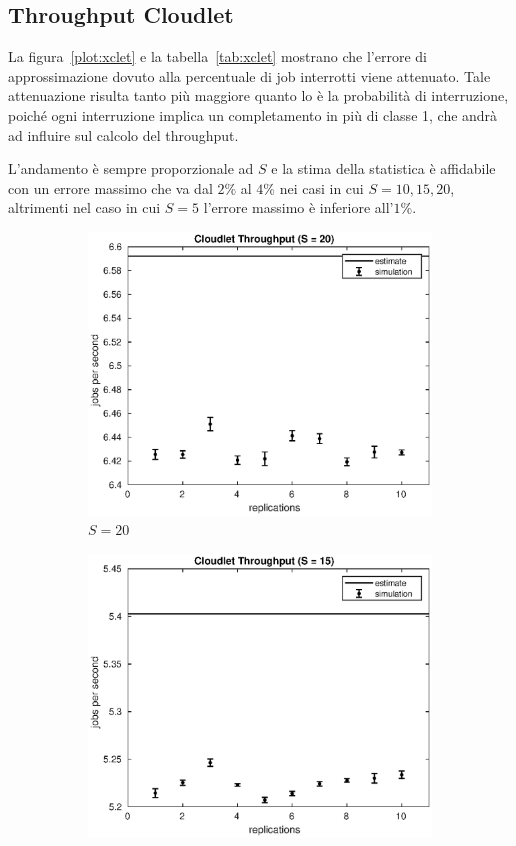 \subsection{Throughput Cloudlet}
La figura~\ref{plot:xclet} e la tabella~\ref{tab:xclet} mostrano che l'errore
di approssimazione dovuto alla percentuale di job interrotti viene attenuato.
Tale attenuazione risulta tanto più maggiore quanto lo è la probabilità di
interruzione, poiché ogni interruzione implica un completamento in più di classe
1, che andrà ad influire sul calcolo del throughput.

L'andamento è sempre proporzionale ad $S$ e la stima della statistica è
affidabile con un errore massimo che va dal $2\%$ al $4\%$ nei casi in cui
$S=10,15,20$, altrimenti nel caso in cui $S=5$ l'errore
massimo è inferiore all'$1\%$.
\begin{figure}[!h]
\centering
%
\begin{subfigure}[t]{0.49\textwidth}
\includegraphics[width=\textwidth]{figures/simul/20_500K_xclet}
\caption{$S = 20$}
\label{20_xclet}
\end{subfigure}
%
\begin{subfigure}[t]{0.49\textwidth}
\includegraphics[width=\textwidth]{figures/simul/15_500K_xclet}

\end{subfigure}
\end{figure}
